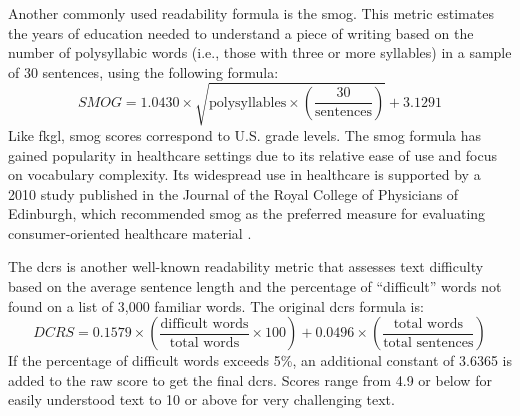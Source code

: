 Another commonly used readability formula is the \gls{smog}. 
This metric estimates the years of education needed to understand a piece of writing based on the number of polysyllabic words (i.e., those with three or more syllables) in a sample of 30 sentences, using the following formula:
\begin{equation}
    \label{eq:smog}
    SMOG = 1.0430 \times \sqrt{\text{polysyllables} \times \left(\frac{30}{\text{sentences}}\right)} + 3.1291
\end{equation}
Like \gls{fkgl}, \gls{smog} scores correspond to U.S. grade levels. 
The \gls{smog} formula has gained popularity in healthcare settings due to its relative ease of use and focus on vocabulary complexity. Its widespread use in healthcare is supported by a 2010 study published in the Journal of the Royal College of Physicians of Edinburgh, which recommended \gls{smog} as the preferred measure for evaluating consumer-oriented healthcare material \cite{Fitzsimmons2010-mq}.

The \gls{dcrs} is another well-known readability metric that assesses text difficulty based on the average sentence length and the percentage of ``difficult'' words not found on a list of 3,000 familiar words. The original \gls{dcrs} formula is:
\begin{equation}
    \label{eq:dcrs}
    DCRS = 0.1579 \times \left(\frac{\text{difficult words}}{\text{total words}} \times 100\right) + 0.0496 \times \left(\frac{\text{total words}}{\text{total sentences}}\right)
\end{equation}
If the percentage of difficult words exceeds 5\%, an additional constant of 3.6365 is added to the raw score to get the final \gls{dcrs}. Scores range from 4.9 or below for easily understood text to 10 or above for very challenging text.

